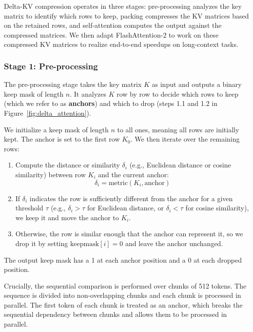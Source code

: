 Delta-KV compression operates in three stages: pre-processing analyzes the key matrix to identify which rows to keep, packing compresses the KV matrices based on the retained rows, and self-attention computes the output against the compressed matrices. We then adapt FlashAttention-2 to work on these compressed KV matrices to realize end-to-end speedups on long-context tasks.

\subsubsection{Stage 1: Pre-processing}
\label{sec:preprocessing}

The pre-processing stage takes the key matrix $K$ as input and outputs a binary keep mask of length $n$. It analyzes $K$ row by row to decide which rows to keep (which we refer to as \textbf{anchors}) and which to drop (steps 1.1 and 1.2 in Figure~\ref{fig:delta_attention}).

We initialize a keep mask of length $n$ to all ones, meaning all rows are initially kept. The anchor is set to the first row $K_0$. We then iterate over the remaining rows:

\begin{enumerate}
    \item Compute the distance or similarity $\delta_i$ (e.g., Euclidean distance or cosine similarity) between row $K_i$ and the current anchor:
    \begin{equation}
        \delta_i = \text{metric}(K_i, \text{anchor})
    \end{equation}
    \item If $\delta_i$ indicates the row is sufficiently different from the anchor for a given threshold $\tau$ (e.g., $\delta_i > \tau$ for Euclidean distance, or $\delta_i < \tau$ for cosine similarity), we keep it and move the anchor to $K_i$.
    \item Otherwise, the row is similar enough that the anchor can represent it, so we drop it by setting $\text{keepmask}[i] = 0$ and leave the anchor unchanged.
\end{enumerate}

The output keep mask has a 1 at each anchor position and a 0 at each dropped position.

Crucially, the sequential comparison is performed over chunks of 512 tokens. The sequence is divided into non-overlapping chunks and each chunk is processed in parallel. The first token of each chunk is treated as an anchor, which breaks the sequential dependency between chunks and allows them to be processed in parallel.

